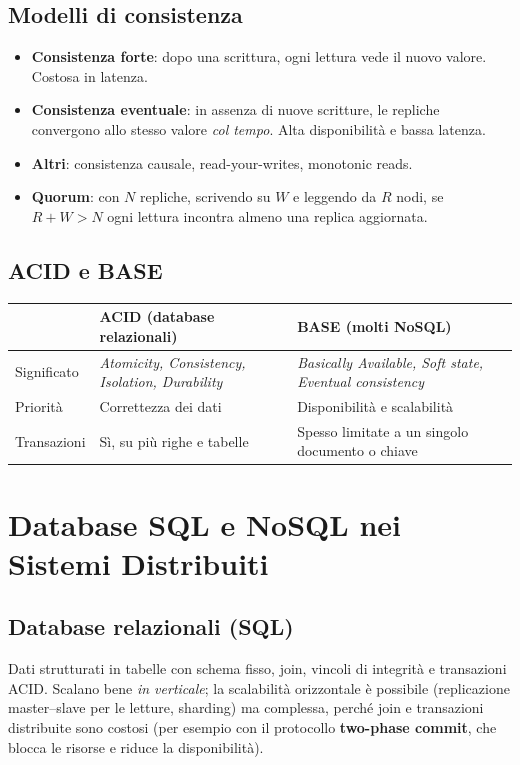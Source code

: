 \subsection{Modelli di consistenza}
\begin{itemize}
    \item \textbf{Consistenza forte}: dopo una scrittura, ogni lettura vede il nuovo valore. Costosa in latenza.
    \item \textbf{Consistenza eventuale}: in assenza di nuove scritture, le repliche convergono allo stesso valore \emph{col tempo}. Alta disponibilità e bassa latenza.
    \item \textbf{Altri}: consistenza causale, read-your-writes, monotonic reads.
    \item \textbf{Quorum}: con $N$ repliche, scrivendo su $W$ e leggendo da $R$ nodi, se $R + W > N$ ogni lettura incontra almeno una replica aggiornata.
\end{itemize}

\subsection{ACID e BASE}
\begin{center}
\begin{tabularx}{\textwidth}{@{}lXX@{}}
\toprule
 & \textbf{ACID (database relazionali)} & \textbf{BASE (molti NoSQL)} \\
\midrule
Significato & \emph{Atomicity, Consistency, Isolation, Durability} & \emph{Basically Available, Soft state, Eventual consistency} \\
Priorità & Correttezza dei dati & Disponibilità e scalabilità \\
Transazioni & Sì, su più righe e tabelle & Spesso limitate a un singolo documento o chiave \\
\bottomrule
\end{tabularx}
\end{center}

\section{Database SQL e NoSQL nei Sistemi Distribuiti}

\subsection{Database relazionali (SQL)}
Dati strutturati in tabelle con schema fisso, join, vincoli di integrità e transazioni ACID. Scalano bene \emph{in verticale}; la scalabilità orizzontale è possibile (replicazione master--slave per le letture, sharding) ma complessa, perché join e transazioni distribuite sono costosi (per esempio con il protocollo \textbf{two-phase commit}, che blocca le risorse e riduce la disponibilità).

